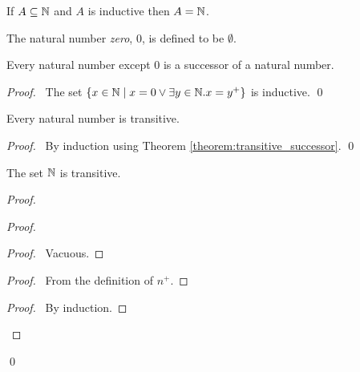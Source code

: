 \begin{corollary}
    If $A \subseteq \mathbb{N}$ and $A$ is inductive then $A = \mathbb{N}$.
\end{corollary}

\begin{definition}
    The natural number \emph{zero}, $0$, is defined to be $\emptyset$.
\end{definition}

\begin{theorem}
    Every natural number except 0 is a successor of a natural number.
\end{theorem}

\begin{proof}
    \pf\ The set $\{ x \in \mathbb{N} \mid x = 0 \vee \exists y \in \mathbb{N}. x = y^+ \}$ is inductive. \qed
\end{proof}

\begin{theorem}
    Every natural number is transitive.
\end{theorem}

\begin{proof}
    \pf\ By induction using Theorem \ref{theorem:transitive_successor}. \qed
\end{proof}

\begin{theorem}
    The set $\mathbb{N}$ is transitive.
\end{theorem}

\begin{proof}
    \pf
    \begin{proof}
        \begin{proof}
            \pf\ Vacuous.
        \end{proof}
        \begin{proof}
            \pf\ From the definition of $n^+$.
        \end{proof}
        \qedstep
        \begin{proof}
            \pf\ By induction.
        \end{proof}
    \end{proof}
    \qed
\end{proof}

